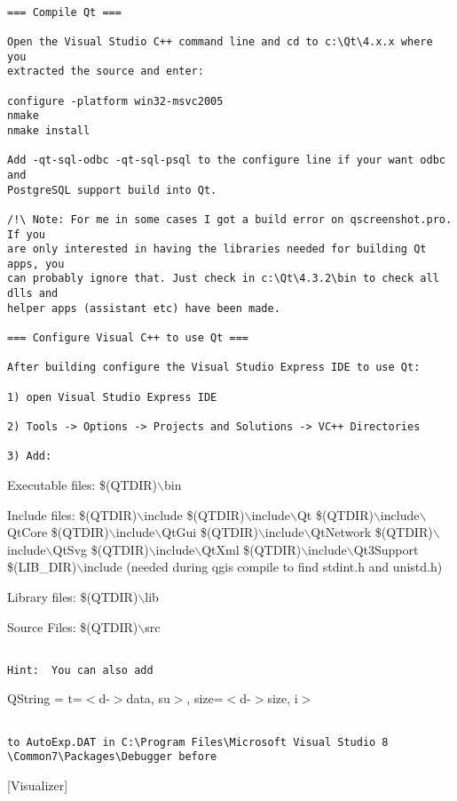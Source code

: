 \begin{verbatim}

=== Compile Qt ===

Open the Visual Studio C++ command line and cd to c:\Qt\4.x.x where you
extracted the source and enter:

configure -platform win32-msvc2005
nmake
nmake install

Add -qt-sql-odbc -qt-sql-psql to the configure line if your want odbc and
PostgreSQL support build into Qt.

/!\ Note: For me in some cases I got a build error on qscreenshot.pro. If you
are only interested in having the libraries needed for building Qt apps, you 
can probably ignore that. Just check in c:\Qt\4.3.2\bin to check all dlls and 
helper apps (assistant etc) have been made.

=== Configure Visual C++ to use Qt ===

After building configure the Visual Studio Express IDE to use Qt:

1) open Visual Studio Express IDE

2) Tools -> Options -> Projects and Solutions -> VC++ Directories

3) Add:
\end{verbatim}
Executable files: 
  \$(QTDIR)$\backslash$bin

Include files: 
  \$(QTDIR)$\backslash$include
  \$(QTDIR)$\backslash$include$\backslash$Qt
  \$(QTDIR)$\backslash$include$\backslash$QtCore
  \$(QTDIR)$\backslash$include$\backslash$QtGui
  \$(QTDIR)$\backslash$include$\backslash$QtNetwork
  \$(QTDIR)$\backslash$include$\backslash$QtSvg
  \$(QTDIR)$\backslash$include$\backslash$QtXml
  \$(QTDIR)$\backslash$include$\backslash$Qt3Support
  \$(LIB\_DIR)$\backslash$include   (needed during qgis compile to find stdint.h and unistd.h)

Library files: 
  \$(QTDIR)$\backslash$lib

Source Files:
  \$(QTDIR)$\backslash$src

\begin{verbatim}

Hint:  You can also add

\end{verbatim}
QString = t=$<$d-$>$data, su$>$, size=$<$d-$>$size, i$>$

\begin{verbatim}

to AutoExp.DAT in C:\Program Files\Microsoft Visual Studio 8
\Common7\Packages\Debugger before 

\end{verbatim}
[Visualizer]


